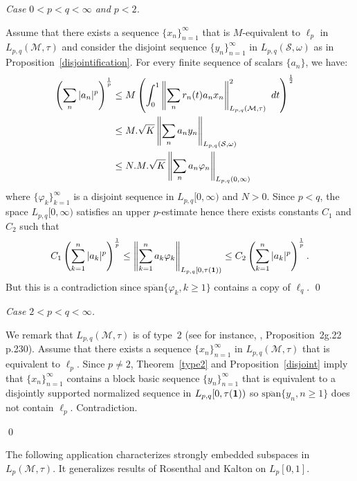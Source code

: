 \documentclass[12pt]{amsart}
\let\cal\mathcal
\def\m{{\cal M}}
\numberwithin{equation}{section}
\numberwithin{theorem}{section}
\begin{document}
\smallskip

\noindent
{\it Case $0<p<q<\infty$ and $p<2$.}

Assume that  there exists a sequence $\{x_n\}_{n=1}^\infty$ that
is $M$-equivalent to $\ell_p$ in $L_{p,q}(\m,\tau)$ and consider the 
disjoint sequence
$\{y_n\}_{n=1}^\infty$ in $L_{p,q}(\cal S,\omega)$ as in 
Proposition~\ref{disjointification}.
For every finite sequence of scalars $\{a_n\}$, we have:
\begin{equation*}
\begin{split}
\left(\sum_n \vert a_{n} \vert^{p}\right)^{\frac{1}{p}} 
&\leq M \left(\int_{0}^1 \left\Vert \sum_n
 r_n(t) a_{n} x_{n} \right\Vert_{L_{p,q}(\cal M, \tau)}^2  \ dt 
\right)^{\frac12} \cr
&\leq M.\sqrt{K}  \left\Vert\sum_n  a_{n} y_n
\right\Vert_{L_{p,q}(\cal S,\omega)}  \cr
&\leq N.M.\sqrt{K}\left\Vert \sum_n a_{n} \varphi_{n}
\right\Vert_{L_{p,q}(0,\infty)}  
\end{split}
\end{equation*}
where $\{\varphi_{k}\}_{k=1}^\infty$ is a disjoint sequence in 
$L_{p,q}[0,\infty)$ and $N>0$. Since $p<q$, the space $L_{p,q}[0,\infty)$
satisfies an upper $p$-estimate hence there exists constants $C_1$ and
$C_2$ such that
$$C_1\left( \sum_{k=1}^n \vert a_k \vert^p \right)^{\frac{1}{p}}
\leq \left\Vert \sum_{k=1}^n a_k \varphi_k 
\right\Vert_{L_{p,q}[0,\tau({\bf 1}))}
\leq C_2\left( \sum_{k=1}^n \vert a_k \vert^p \right)^{\frac{1}{p}}.$$
But this is a contradiction since 
$\overline{\text{span}}\{\varphi_k, k\geq 1 \}$ contains a copy of 
$\ell_q$.
\qed

\smallskip

\noindent
{\it Case  $2<p<q<\infty$.}

 We remark that $L_{p,q}(\m,\tau)$ is of type~2 (see for instance,
\cite{LT}, Proposition~2g.22 p.230).
Assume that there exists a sequence $\{x_n\}_{n=1}^\infty$ in
 $L_{p,q}(\m,\tau)$ that
is equivalent to $\ell_p$. Since $p\neq 2$, Theorem~\ref{type2} 
 and 
Proposition~\ref{disjoint} imply that 
$\{x_n\}_{n=1}^\infty$ contains a block basic sequence $\{y_n\}_{n=1}^\infty$ 
that is equivalent to a disjointly supported normalized sequence in
$L_{p,q}[0,\tau({\bf 1}))$ so 
$\overline{\text{span}}\{y_n, n\geq 1\}$ does not contain $\ell_p$. 
 Contradiction.

\qed

\smallskip

The following application characterizes strongly embedded subspaces in
$L_p(\m,\tau)$. It generalizes results of Rosenthal and Kalton on
$L_p[0,1]$.
\end{document}
